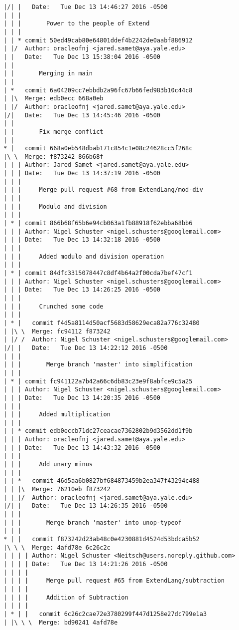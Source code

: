 \begin{lstlisting}
|/| |   Date:   Tue Dec 13 14:46:27 2016 -0500
| | |   
| | |       Power to the people of Extend
| | |    
| | * commit 50ed49cab80e64801ddef4b2242de0aabf886912
| |/  Author: oracleofnj <jared.samet@aya.yale.edu>
| |   Date:   Tue Dec 13 15:38:04 2016 -0500
| |   
| |       Merging in main
| |     
| *   commit 6a04209cc7ebbdb2a96fc67b66fed983b10c44c8
| |\  Merge: edb0ecc 668a0eb
| |/  Author: oracleofnj <jared.samet@aya.yale.edu>
|/|   Date:   Tue Dec 13 14:45:46 2016 -0500
| |   
| |       Fix merge conflict
| |     
* |   commit 668a0eb548dbab171c854c1e08c24628cc5f268c
|\ \  Merge: f873242 866b68f
| | | Author: Jared Samet <jared.samet@aya.yale.edu>
| | | Date:   Tue Dec 13 14:37:19 2016 -0500
| | | 
| | |     Merge pull request #68 from ExtendLang/mod-div
| | |     
| | |     Modulo and division
| | |    
| * | commit 866b68f65b6e94cb063a1fb88918f62ebba68bb6
| | | Author: Nigel Schuster <nigel.schusters@googlemail.com>
| | | Date:   Tue Dec 13 14:32:18 2016 -0500
| | | 
| | |     Added modulo and division operation
| | |    
| * | commit 84dfc3315078447c8df4b64a2f00cda7bef47cf1
| | | Author: Nigel Schuster <nigel.schusters@googlemail.com>
| | | Date:   Tue Dec 13 14:26:25 2016 -0500
| | | 
| | |     Crunched some code
| | |      
| * |   commit f4d5a8114d50acf5683d58629eca82a776c32480
| |\ \  Merge: fc94112 f873242
| |/ /  Author: Nigel Schuster <nigel.schusters@googlemail.com>
|/| |   Date:   Tue Dec 13 14:22:12 2016 -0500
| | |   
| | |       Merge branch 'master' into simplification
| | |    
| * | commit fc941122a7b42a66c6db83c23e9f8abfce9c5a25
| | | Author: Nigel Schuster <nigel.schusters@googlemail.com>
| | | Date:   Tue Dec 13 14:20:35 2016 -0500
| | | 
| | |     Added multiplication
| | |    
| | * commit edb0eccb71dc27ceacae7362802b9d3562dd1f9b
| | | Author: oracleofnj <jared.samet@aya.yale.edu>
| | | Date:   Tue Dec 13 14:43:32 2016 -0500
| | | 
| | |     Add unary minus
| | |      
| | *   commit 46d5aa6b0827bf684873459b2ea347f43294c488
| | |\  Merge: 76210eb f873242
| |_|/  Author: oracleofnj <jared.samet@aya.yale.edu>
|/| |   Date:   Tue Dec 13 14:26:35 2016 -0500
| | |   
| | |       Merge branch 'master' into unop-typeof
| | |      
* | |   commit f873242d23ab48c0e4230881d4524d53bdca5b52
|\ \ \  Merge: 4afd78e 6c26c2c
| | | | Author: Nigel Schuster <Neitsch@users.noreply.github.com>
| | | | Date:   Tue Dec 13 14:21:26 2016 -0500
| | | | 
| | | |     Merge pull request #65 from ExtendLang/subtraction
| | | |     
| | | |     Addition of Subtraction
| | | |       
| * | |   commit 6c26c2cae72e3780299f447d1258e27dc799e1a3
| |\ \ \  Merge: bd90241 4afd78e

\end{lstlisting}
